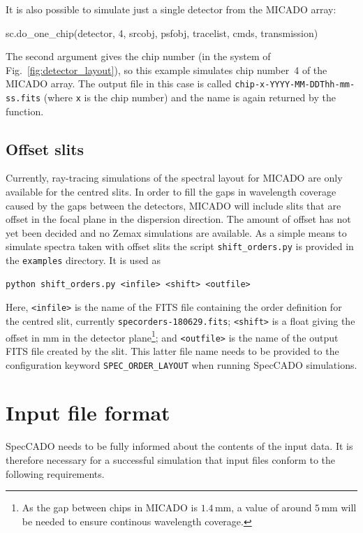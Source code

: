 \documentclass[a4paper,twoside,11pt]{article}
\begin{document}
It is also possible to simulate just a single detector from the MICADO
array:
\begin{pyin}
sc.do_one_chip(detector, 4, srcobj, psfobj, tracelist, cmds,
               transmission)
\end{pyin}
The second argument gives the chip number (in the system of
Fig.~\ref{fig:detector_layout}), so this example simulates chip
number~4 of the MICADO array. The output file in this case is called
\lstinline{chip-x-YYYY-MM-DDThh-mm-ss.fits} (where \lstinline{x} is
the chip number) and the name is again returned by the function.


\subsection{Offset slits}
\label{ssec:offset_slits}

Currently, ray-tracing simulations of the spectral layout for MICADO
are only available for the centred slits. In order to fill the gaps in
wavelength coverage caused by the gaps between the detectors, MICADO
will include slits that are offset in the focal plane in the
dispersion direction. The amount of offset has not yet been decided
and no Zemax simulations are available. As a simple means to simulate
spectra taken with offset slits the script \lstinline{shift_orders.py}
is provided in the \lstinline{examples} directory. It is used as
\begin{lstlisting}[style=csh]
python shift_orders.py <infile> <shift> <outfile>
\end{lstlisting}
Here, \lstinline{<infile>} is the name of the FITS file containing the
order definition for the centred slit, currently
\lstinline{specorders-180629.fits}; \lstinline{<shift>} is a float
giving the offset in mm in the detector plane\footnote{As the gap
  between chips in MICADO is $1.4\,\mathrm{mm}$, a value of around
  $5\,\mathrm{mm}$ will be needed to ensure continous wavelength
  coverage.}; and \lstinline{<outfile>} is the name of the output FITS
file created by the slit. This latter file name needs to be provided
to the configuration keyword \lstinline{SPEC_ORDER_LAYOUT} when
running SpecCADO simulations.


\section{Input file format}
\label{sec:input_format}

SpecCADO needs to be fully informed about the contents of the input
data. It is therefore necessary for a successful simulation that input
files conform to the following requirements.
\end{document}
